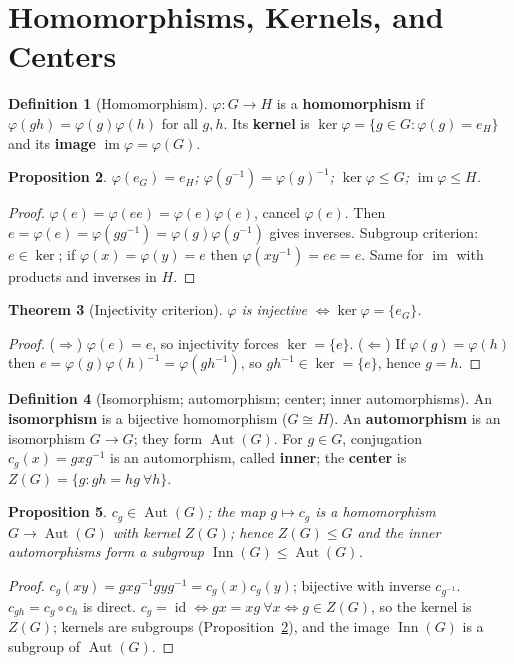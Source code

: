 \documentclass[11pt,a4paper]{article}
\newtheorem{theorem}{Theorem}[section]
\newtheorem{proposition}[theorem]{Proposition}
\theoremstyle{definition}
\newtheorem{definition}[theorem]{Definition}
\newcommand{\Aut}{\operatorname{Aut}}
\newcommand{\Inn}{\operatorname{Inn}}
\newcommand{\im}{\operatorname{im}}
\newcommand{\id}{\operatorname{id}}
\begin{document}
	\section{Homomorphisms, Kernels, and Centers}
	
	\begin{definition}[Homomorphism]
		$\varphi:G\to H$ is a \textbf{homomorphism} if $\varphi(gh)=\varphi(g)\varphi(h)$ for all $g,h$.
		Its \textbf{kernel} is $\ker\varphi=\{g\in G:\varphi(g)=e_H\}$ and its \textbf{image}
		$\im\varphi=\varphi(G)$.
	\end{definition}
	
	\begin{proposition}\label{prop:hom-basics}
		$\varphi(e_G)=e_H$; $\varphi(g^{-1})=\varphi(g)^{-1}$; $\ker\varphi\le G$; $\im\varphi\le H$.
	\end{proposition}
	\begin{proof}
		$\varphi(e)=\varphi(ee)=\varphi(e)\varphi(e)$, cancel $\varphi(e)$. Then
		$e=\varphi(e)=\varphi(gg^{-1})=\varphi(g)\varphi(g^{-1})$ gives inverses. Subgroup criterion:
		$e\in\ker$; if $\varphi(x)=\varphi(y)=e$ then $\varphi(xy^{-1})=ee=e$. Same for $\im$ with products
		and inverses in $H$.
	\end{proof}
	
	\begin{theorem}[Injectivity criterion]\label{thm:injective}
		$\varphi$ is injective $\iff\ker\varphi=\{e_G\}$.
	\end{theorem}
	\begin{proof}
		($\Rightarrow$) $\varphi(e)=e$, so injectivity forces $\ker=\{e\}$. ($\Leftarrow$) If
		$\varphi(g)=\varphi(h)$ then $e=\varphi(g)\varphi(h)^{-1}=\varphi(gh^{-1})$, so $gh^{-1}\in\ker=\{e\}$,
		hence $g=h$.
	\end{proof}
	
	\begin{definition}[Isomorphism; automorphism; center; inner automorphisms]
		An \textbf{isomorphism} is a bijective homomorphism ($G\cong H$). An \textbf{automorphism} is an
		isomorphism $G\to G$; they form $\Aut(G)$. For $g\in G$, conjugation $c_g(x)=gxg^{-1}$ is an
		automorphism, called \textbf{inner}; the \textbf{center} is $Z(G)=\{g:gh=hg\ \forall h\}$.
	\end{definition}
	
	\begin{proposition}
		$c_g\in\Aut(G)$; the map $g\mapsto c_g$ is a homomorphism $G\to\Aut(G)$ with kernel $Z(G)$; hence
		$Z(G)\le G$ and the inner automorphisms form a subgroup $\Inn(G)\le\Aut(G)$.
	\end{proposition}
	\begin{proof}
		$c_g(xy)=gxg^{-1}gyg^{-1}=c_g(x)c_g(y)$; bijective with inverse $c_{g^{-1}}$. $c_{gh}=c_g\circ c_h$ is
		direct. $c_g=\id\iff gx=xg\ \forall x\iff g\in Z(G)$, so the kernel is $Z(G)$; kernels are subgroups
		(Proposition~\ref{prop:hom-basics}), and the image $\Inn(G)$ is a subgroup of $\Aut(G)$.
	\end{proof}
	
\end{document}
